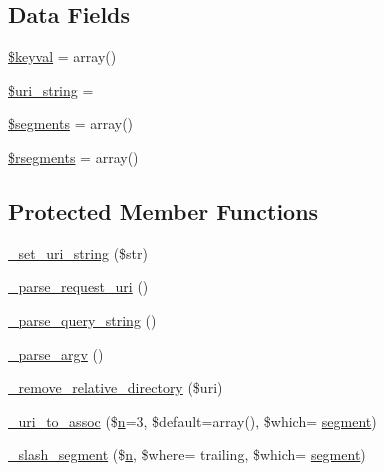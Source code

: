\subsection*{Data Fields}
\begin{DoxyCompactItemize}
\item 
\hyperlink{class_c_i___u_r_i_ae15942155aae4760439f552ad1fc3c34}{\$keyval} = array()
\item 
\hyperlink{class_c_i___u_r_i_ab908b3e655463a05e8a646c965ca4e53}{\$uri\+\_\+string} = \textquotesingle{}\textquotesingle{}
\item 
\hyperlink{class_c_i___u_r_i_a8d7f597e2b6cf2aaef663822d1b96a82}{\$segments} = array()
\item 
\hyperlink{class_c_i___u_r_i_abf60189292b5fda02cdf36e5d7417a33}{\$rsegments} = array()
\end{DoxyCompactItemize}
\subsection*{Protected Member Functions}
\begin{DoxyCompactItemize}
\item 
\hyperlink{class_c_i___u_r_i_a81a4c4d50fbac24b9ae091f9cfcaade3}{\+\_\+set\+\_\+uri\+\_\+string} (\$str)
\item 
\hyperlink{class_c_i___u_r_i_ae2e75a6f6657df51c7b6de926979af29}{\+\_\+parse\+\_\+request\+\_\+uri} ()
\item 
\hyperlink{class_c_i___u_r_i_a2bb6abbe64a923ffef79a4a4c3da93db}{\+\_\+parse\+\_\+query\+\_\+string} ()
\item 
\hyperlink{class_c_i___u_r_i_a336e05909197d401613263ebdab6550c}{\+\_\+parse\+\_\+argv} ()
\item 
\hyperlink{class_c_i___u_r_i_a01fdc82a66a1611d3e5d42461c1ad59c}{\+\_\+remove\+\_\+relative\+\_\+directory} (\$uri)
\item 
\hyperlink{class_c_i___u_r_i_a8f7962a57049a3767fdfa4c1a004dc98}{\+\_\+uri\+\_\+to\+\_\+assoc} (\$\hyperlink{cli_2error__general_8php_ace0fd03cd383f20ce6ea63247a207294}{n}=3, \$default=array(), \$which= \textquotesingle{}\hyperlink{class_c_i___u_r_i_aeea297fbd38079886a2de35d633c1ed5}{segment}\textquotesingle{})
\item 
\hyperlink{class_c_i___u_r_i_aeb479c7fb188fad2720246af4827ea9a}{\+\_\+slash\+\_\+segment} (\$\hyperlink{cli_2error__general_8php_ace0fd03cd383f20ce6ea63247a207294}{n}, \$where= \textquotesingle{}trailing\textquotesingle{}, \$which= \textquotesingle{}\hyperlink{class_c_i___u_r_i_aeea297fbd38079886a2de35d633c1ed5}{segment}\textquotesingle{})
\end{DoxyCompactItemize}
